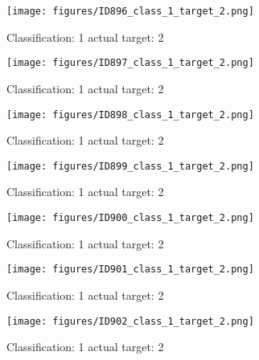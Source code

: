 \begin{figure}[h!]
\begin{center}
\texttt{[image: figures/ID896\_class\_1\_target\_2.png]}
\end{center}
\caption{ Classification: 1 actual target: 2}
\label{fig:ID896_class_1_target_2}
\end{figure}
\begin{figure}[h!]
\begin{center}
\texttt{[image: figures/ID897\_class\_1\_target\_2.png]}
\end{center}
\caption{ Classification: 1 actual target: 2}
\label{fig:ID897_class_1_target_2}
\end{figure}
\begin{figure}[h!]
\begin{center}
\texttt{[image: figures/ID898\_class\_1\_target\_2.png]}
\end{center}
\caption{ Classification: 1 actual target: 2}
\label{fig:ID898_class_1_target_2}
\end{figure}
\begin{figure}[h!]
\begin{center}
\texttt{[image: figures/ID899\_class\_1\_target\_2.png]}
\end{center}
\caption{ Classification: 1 actual target: 2}
\label{fig:ID899_class_1_target_2}
\end{figure}
\begin{figure}[h!]
\begin{center}
\texttt{[image: figures/ID900\_class\_1\_target\_2.png]}
\end{center}
\caption{ Classification: 1 actual target: 2}
\label{fig:ID900_class_1_target_2}
\end{figure}
\begin{figure}[h!]
\begin{center}
\texttt{[image: figures/ID901\_class\_1\_target\_2.png]}
\end{center}
\caption{ Classification: 1 actual target: 2}
\label{fig:ID901_class_1_target_2}
\end{figure}
\begin{figure}[h!]
\begin{center}
\texttt{[image: figures/ID902\_class\_1\_target\_2.png]}
\end{center}
\caption{ Classification: 1 actual target: 2}
\label{fig:ID902_class_1_target_2}
\end{figure}
